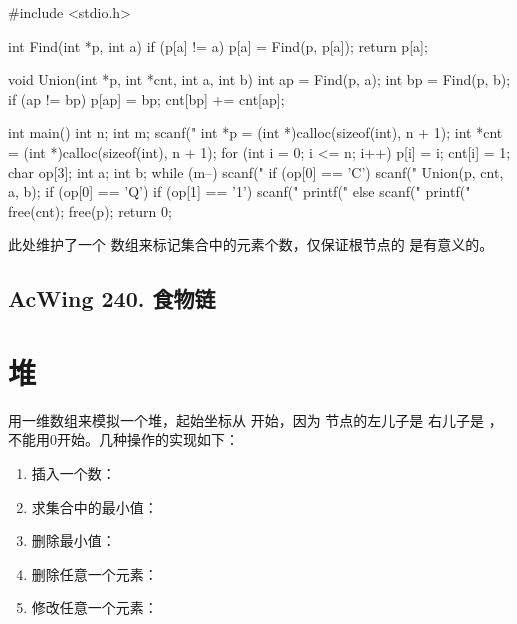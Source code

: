 \begin{mycpptwocol}[]
    #include <stdio.h>

    int Find(int *p, int a) {
        if (p[a] != a) {
            p[a] = Find(p, p[a]);
        }
        return p[a];
    }

    void Union(int *p, int *cnt, int a, int b) {
        int ap = Find(p, a);
        int bp = Find(p, b);
        if (ap != bp) {
            p[ap] = bp;
            cnt[bp] += cnt[ap];
        }
    }

    int main() {
        int n;
        int m;
        scanf("%
        int *p = (int *)calloc(sizeof(int), n + 1);
        int *cnt = (int *)calloc(sizeof(int), n + 1);
        for (int i = 0; i <= n; i++) {
            p[i] = i;
            cnt[i] = 1;
        }
        char op[3];
        int a;
        int b;
        while (m--) {
            scanf("%
            if (op[0] == 'C') {
                scanf("%
                Union(p, cnt, a, b);
            }
            if (op[0] == 'Q') {
                if (op[1] == '1') {
                    scanf("%
                    printf("%
                } else {
                    scanf("%
                    printf("%
                }
            }
        }
        free(cnt);
        free(p);
        return 0;
    }
\end{mycpptwocol}

\begin{information}
    此处维护了一个  数组来标记集合中的元素个数，仅保证根节点的  是有意义的。
\end{information}

\subsection{AcWing 240. 食物链}


\section{堆}

用一维数组来模拟一个堆，起始坐标从  开始，因为  节点的左儿子是  右儿子是  ，不能用0开始。几种操作的实现如下：

\begin{enumerate}
    \item 插入一个数： 
    \item 求集合中的最小值： 
    \item 删除最小值： 
    \item 删除任意一个元素： 
    \item 修改任意一个元素： 
\end{enumerate}


